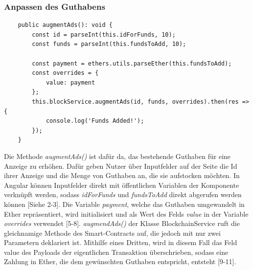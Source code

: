 \subsubsection{Anpassen des Guthabens}
\begin{lstlisting}
	public augmentAds(): void {
		const id = parseInt(this.idForFunds, 10);
		const funds = parseInt(this.fundsToAdd, 10);
		
		const payment = ethers.utils.parseEther(this.fundsToAdd);
		const overrides = {
			value: payment
		};
		this.blockService.augmentAds(id, funds, overrides).then(res => {
			console.log('Funds Added!');
		});
	}
\end{lstlisting}
Die Methode \emph{augmentAds()} ist dafür da, das bestehende Guthaben für eine Anzeige zu erhöhen. 
Dafür geben Nutzer über Inputfelder auf der Seite die Id ihrer Anzeige und die Menge von Guthaben an, die sie aufstocken möchten. 
In Angular können Inputfelder direkt mit öffentlichen Variablen der Komponente verknüpft werden, sodass \emph{idForFunds} und \emph{fundsToAdd} direkt abgerufen werden können [Siehe 2-3]. Die Variable \emph{payment}, welche das Guthaben umgewandelt in Ether repräsentiert, wird initialisiert und als Wert des Felds \emph{value} in der Variable \emph{overrides} verwendet [5-8]. \emph{augmendAds()} der Klasse BlockchainService ruft die gleichnamige Methode des Smart-Contracts auf, die jedoch mit nur zwei Parametern deklariert ist. Mithilfe eines Dritten, wird in diesem Fall das Feld value des Payloads der eigentlichen Transaktion überschrieben, sodass eine Zahlung in Ether, die dem gewünschten Guthaben entspricht, entsteht [9-11]. 
